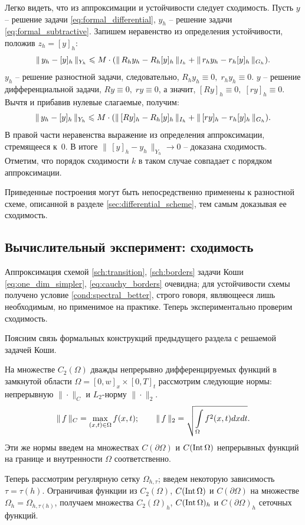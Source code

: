 Легко видеть, что из аппроксимации и устойчивости следует сходимость. Пусть $y$ -- решение задачи \eqref{eq:formal_differential}, $y_h$ -- решение задачи \eqref{eq:formal_subtractive}. Запишем неравенство из определения устойчивости, положив $z_h = [y]_h$:
$$\| \, y_h - [y]_h \, \|_{Y_h} \leqslant M \cdot (\| \, R_h y_h - R_h [y]_h \, \|_{I_h} + \| \, r_h y_h - r_h [y]_h \, \|_{G_h}) {\text{.}}$$
$y_h$ -- решение разностной задачи, следовательно, $R_h y_h \equiv 0, \; r_h y_h \equiv 0$. $y$ -- решение дифференциальной задачи, $Ry \equiv 0, \; ry \equiv 0$, а значит, $[Ry]_h \equiv 0, \; [ry]_h \equiv 0$. Вычтя и прибавив нулевые слагаемые, получим:
$$\| \, y_h - [y]_h \, \|_{Y_h} \leqslant M \cdot (\| \, [Ry]_h - R_h [y]_h \, \|_{I_h} + \| \, [ry]_h - r_h [y]_h \, \|_{G_h}) {\text{.}}$$
В правой части неравенства выражение из определения аппроксимации, стремящееся к~$0$. В итоге $\| \, [y]_h - y_h \, \|_{Y_h} \to 0$ -- доказана сходимость. Отметим, что порядок сходимости $k$ в таком случае совпадает с порядком аппроксимации.

Приведенные построения могут быть непосредственно применены к разностной схеме, описанной в разделе \ref{sec:differential_scheme}, тем самым доказывая ее сходимость.


\subsection{Вычислительный эксперимент: сходимость}

Аппроксимация схемой \eqref{sch:transition}, \eqref{sch:borders} задачи Коши \eqref{eq:one_dim_simpler}, \eqref{eq:cauchy_borders} очевидна; для устойчивости схемы получено условие \eqref{cond:spectral_better}, строго говоря, являющееся лишь необходимым, но применимое на практике. Теперь экспериментально проверим сходимость.

Поясним связь формальных конструкций предыдущего раздела с решаемой задачей Коши.

На множестве $C_2(\Omega)$ дважды непрерывно дифференцируемых функций в замкнутой области $\Omega = [0, w]_x \times [0, T]_t$ рассмотрим следующие нормы: непрерывную $\| \cdot \|_C$ и $L_2$-норму $\| \cdot \|_2$.
$$\| \, f \, \|_C = \max \limits_{(x, t) \in \Omega} f(x, t); \qquad \| \, f \, \|_{2} = \sqrt{\int \limits_{\Omega} f^2(x, t) dx dt} {\text{.}}$$
Эти же нормы введем на множествах $C(\partial \Omega)$ и $C(\operatorname{{Int}} \Omega)$ непрерывных функций на границе и внутренности $\Omega$ соответственно.

Теперь рассмотрим регулярную сетку $\Omega_{h, \tau}$; введем некоторую зависимость $\tau = \tau(h)$. Ограничивая функции из $C_2(\Omega)$, $C(\operatorname{{Int}} \Omega)$ и $C(\partial \Omega)$ на множестве $\Omega_h = \Omega_{h, \tau(h)}$, получаем множества $C_2(\Omega)_h$, $C(\operatorname{{Int}} \Omega)_h$ и $C(\partial \Omega)_h$ сеточных функций.


